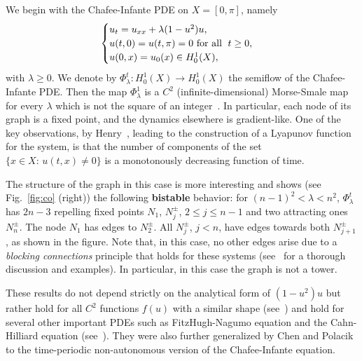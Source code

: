 \documentclass{article}
\def\gr{}
\newcommand{\violet}{\textcolor{violet}}
\def\bR{\mathbb{R}}
\begin{document}
We begin with the Chafee-Infante PDE on $X=[0,\pi]$, namely
%
\begin{equation}
 \begin{cases}
  u_t=u_{xx}+\lambda (1-u^2)u,&\\
  u(t,0)=u(t,\pi)=0\hbox{ for all }\;t\geq0,&\\
  u(0,x)=u_0(x)\in H_0^1(X),&\\
 \end{cases}
\end{equation}
%
with $\lambda\geq0$. 
We denote by $\Phi^t_\lambda:H_0^1(X)\to H_0^1(X)$ the semiflow of the Chafee-Infante PDE. Then the map $\Phi^{1}_\lambda$ is a $C^2$ (infinite-dimensional) Morse-Smale map for every $\lambda$ which is not the square of an integer~\cite{CI74,HMW06}. In particular, each node of its graph is a fixed point, and the dynamics elsewhere is gradient-like. One of the key observations, by Henry~\cite{Hen85}, leading to the construction of a Lyapunov function for the system, is that the number of components of the set
$
\{x\in X:\,u(t,x)\neq0\}
$
is a monotonously decreasing function of time.

The structure of the \gr graph in this case is more interesting and shows (see Fig.~\ref{fig:co} (right)) the following {\bf bistable} behavior: for $(n-1)^2<\lambda<n^2$, $\Phi^t_\lambda$ has $2n-3$ repelling fixed points $N_1$, $N^\pm_j$, $2\leq j\leq n-1$ and two attracting ones $N^\pm_n$. 
The node $N_1$ has edges to $N^\pm_2$. All $N^\pm_{j}$, $j<n$, have edges towards both $N^\pm_{j+1}$, as shown in the figure.
Note that, in this case, no other edges arise due to a {\em blocking connections} principle that holds for these systems (see~\cite{FR96} for a thorough discussion and examples). 
In particular, in this case the graph is not a tower.


These results do not depend strictly on the analytical form of $(1-u^2)u$ but rather hold for all $C^2$ functions $f(u)$ with a similar shape (see~\cite{CI74,HMW06,Lap19}) and hold for several other important PDEs such as FitzHugh-Nagumo equation and the Cahn-Hilliard equation (see~\cite{Lap19}). 
They were also further generalized by Chen and Polacik~\cite{CP95} to the time-periodic non-autonomous version of the Chafee-Infante equation.
\end{document}
